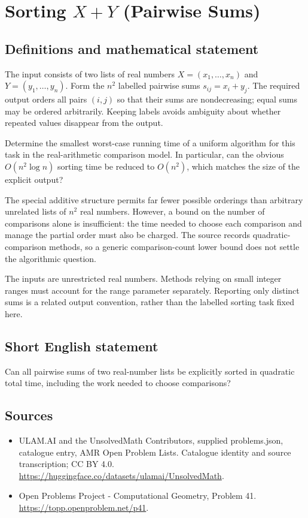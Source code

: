 \documentclass[11pt,a4paper]{article}
\begin{document}
\section*{Sorting $X+Y$ (Pairwise Sums)}\label{statement}

\subsection{Definitions and mathematical statement}
The input consists of two lists of real numbers
$X=(x_1,\ldots,x_n)$ and $Y=(y_1,\ldots,y_n)$. Form the $n^2$ labelled
pairwise sums $s_{ij}=x_i+y_j$. The required output orders all pairs
$(i,j)$ so that their sums are nondecreasing; equal sums may be
ordered arbitrarily. Keeping labels avoids ambiguity about whether
repeated values disappear from the output.

Determine the smallest worst-case running time of a uniform algorithm
for this task in the real-arithmetic comparison model. In particular,
can the obvious $O(n^2\log n)$ sorting time be reduced to $O(n^2)$,
which matches the size of the explicit output?

The special additive structure permits far fewer possible orderings
than arbitrary unrelated lists of $n^2$ real numbers. However, a
bound on the number of comparisons alone is insufficient: the time
needed to choose each comparison and manage the partial order must
also be charged. The source records quadratic-comparison methods,
so a generic comparison-count lower bound does not settle the
algorithmic question.

The inputs are unrestricted real numbers. Methods relying on small
integer ranges must account for the range parameter separately.
Reporting only distinct sums is a related output convention, rather
than the labelled sorting task fixed here.
\subsection{Short English statement}
Can all pairwise sums of two real-number lists be explicitly sorted
in quadratic total time, including the work needed to choose comparisons?
\subsection{Sources}
\begin{itemize}
\item[S1] ULAM.AI and the UnsolvedMath Contributors, supplied problems.json, catalogue entry, AMR Open Problem Lists. Catalogue identity and source transcription; CC BY 4.0.
\url{https://huggingface.co/datasets/ulamai/UnsolvedMath}.
\item[S2] Open Problems Project - Computational Geometry, Problem 41. 
\url{https://topp.openproblem.net/p41}.
\end{itemize}
\end{document}
